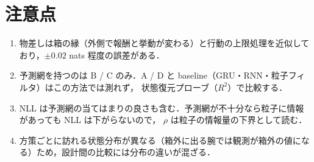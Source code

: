 \documentclass[a4paper,11pt]{article}
\begin{document}
\section{注意点}

\begin{enumerate}
  \item 物差しは箱の縁（外側で報酬と挙動が変わる）と行動の上限処理を近似しており，$\pm 0.02$ nats 程度の誤差がある．
  \item 予測網を持つのは B / C のみ．A / D と baseline（GRU・RNN・粒子フィルタ）はこの方法では測れず，
        状態復元プローブ（$R^2$）で比較する．
  \item NLL は予測網の当てはまりの良さも含む．予測網が不十分なら粒子に情報があっても NLL は下がらないので，
        $\rho$ は粒子の情報量の下界として読む．
  \item 方策ごとに訪れる状態分布が異なる（箱外に出る腕では観測が箱外の値になる）ため，設計間の比較には分布の違いが混ざる．
\end{enumerate}
\end{document}
